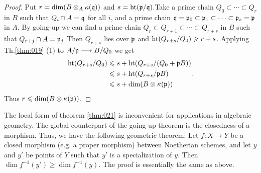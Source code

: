 \documentclass[../main]{subfiles}
\begin{document}
\begin{proof}
Put $r=\operatorname{dim}(B\otimes_A \kappa(\mathfrak{q}))$ and $s=\operatorname{ht}(\mathfrak{p}/\mathfrak{q})$.\newpage {}Take a prime chain $Q_0 \subset \cdots \subset Q_r$ in $B$ such that $Q_i \cap A=\mathfrak{q}$ for all $i$, and a prime chain $\mathfrak{q}=\mathfrak{p}_0 \subset \mathfrak{p}_1 \subset \cdots \subset\mathfrak{p}_s=\mathfrak{p}$ in $A$. By going-up we can find a prime chain $Q_r \subset Q_{r+1} \subset \cdots \subset Q_{r+s}$ in $B$ such that $Q_{r+j} \cap A=\mathfrak{p}_j$ Then $Q_{r+s}$ lies over $\mathfrak{p}$ and $\operatorname{ht}(Q_{r+s} / Q_0)\geqslant r+s$. Applying Th.\ref{thm:019} (1) to $A /\mathfrak{p} \longrightarrow  B / Q_0$ we get 
\[\begin{aligned}\operatorname{ht}(Q_{r+s} / Q_0) &\leqslant s+\operatorname{ht}(Q_{r+s} /(Q_0+\mathfrak{p}B))\\ &\leqslant s+\operatorname{ht}(Q_{r+s} /\mathfrak{p}B)\\ &\leqslant s+\operatorname{dim}(B \otimes \kappa(\mathfrak{p}))\end{aligned}.\] Thus $r \leqslant \operatorname{dim}(B \otimes \kappa(\mathfrak{p}))$.
\end{proof}


\begin{parremark}
The local form of theorem \ref{thm:021} is inconvenient for applications in algebraic geometry. The global counterpart of the going-up theorem is the closedness of a morphism. Thus, we have the following geometric theorem: Let $f: X\longrightarrow Y$ be a closed morphism (e.g. a proper morphism) between Noetherian schemes, and let $y$ and $y'$ be points of $Y$ such that $y'$ is a specialization of $y$. Then $\dim f^{-1}(y') \geqslant \dim f^{-1}(y)$. The proof is essentially the same as above.
\end{parremark}
\end{document}
